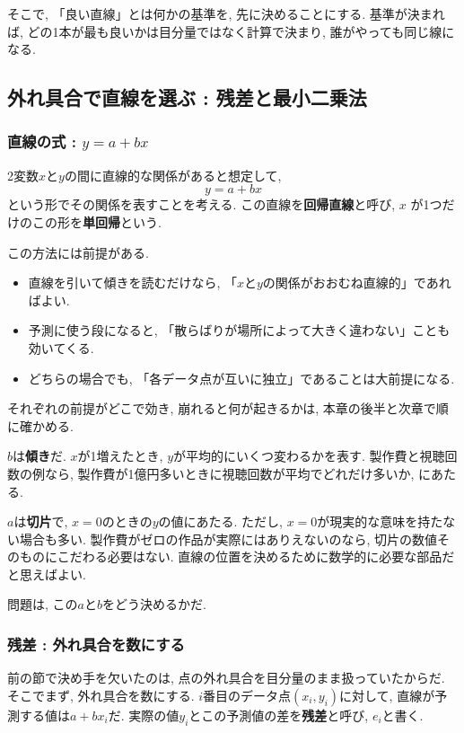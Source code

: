 そこで, 「良い直線」とは何かの基準を, 先に決めることにする.
基準が決まれば, どの1本が最も良いかは目分量ではなく計算で決まり, 誰がやっても同じ線になる.


\subsection{外れ具合で直線を選ぶ : 残差と最小二乗法}

\subsubsection*{直線の式 : \texorpdfstring{$y = a + bx$}{y = a + bx}}

2変数$x$と$y$の間に直線的な関係があると想定して,
\[
  y = a + bx
\]
という形でその関係を表すことを考える.
この直線を\textbf{回帰直線}と呼び, $x$ が1つだけのこの形を\textbf{単回帰}という.

この方法には前提がある.
\begin{itemize}
  \item 直線を引いて傾きを読むだけなら, 「$x$と$y$の関係がおおむね直線的」であればよい.
  \item 予測に使う段になると, 「散らばりが場所によって大きく違わない」ことも効いてくる.
  \item どちらの場合でも, 「各データ点が互いに独立」であることは大前提になる.
\end{itemize}
それぞれの前提がどこで効き, 崩れると何が起きるかは, 本章の後半と次章で順に確かめる.

$b$は\textbf{傾き}だ.
$x$が1増えたとき, $y$が平均的にいくつ変わるかを表す.
製作費と視聴回数の例なら, 製作費が1億円多いときに視聴回数が平均でどれだけ多いか, にあたる.

$a$は\textbf{切片}で, $x = 0$のときの$y$の値にあたる.
ただし, $x = 0$が現実的な意味を持たない場合も多い.
製作費がゼロの作品が実際にはありえないのなら, 切片の数値そのものにこだわる必要はない.
直線の位置を決めるために数学的に必要な部品だと思えばよい.

問題は, この$a$と$b$をどう決めるかだ.

\subsubsection*{残差 : 外れ具合を数にする}

前の節で決め手を欠いたのは, 点の外れ具合を目分量のまま扱っていたからだ.
そこでまず, 外れ具合を数にする.
$i$番目のデータ点$(x_i, y_i)$に対して, 直線が予測する値は$a + bx_i$だ.
実際の値$y_i$とこの予測値の差を\textbf{残差}と呼び, $e_i$と書く.

